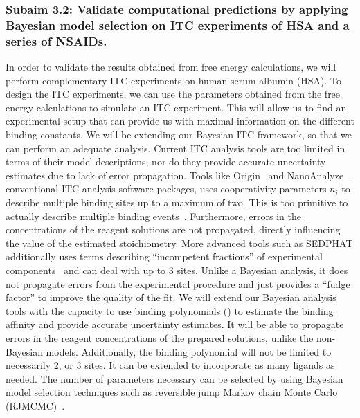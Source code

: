 \documentclass[10pt,final]{article}
\begin{document}
\subsubsection*{Subaim 3.2: Validate computational predictions by applying Bayesian model selection on ITC  experiments of HSA and a series of NSAIDs.}
In order to validate the results obtained from free energy calculations, we will perform complementary ITC experiments on human serum albumin (HSA). 
%
To design the ITC experiments, we can use the parameters obtained from the free energy calculations to simulate an ITC experiment.
%
This will allow us to find an experimental setup that can provide us with maximal information on the different binding constants.
%
We will be extending our Bayesian ITC framework, so that we can perform an adequate analysis. 
%
Current ITC analysis tools are too limited in terms of their model descriptions, nor do they provide accurate uncertainty estimates due to lack of error propagation.
%
Tools like Origin~\autocite{MicroCal2004a} and NanoAnalyze~\autocite{NanoAnalyze2014a}, conventional ITC analysis software packages, uses cooperativity parameters $n_i$ to describe multiple binding sites up to a maximum of two.
%
This is too primitive to actually describe multiple binding events~\autocite{Klotz1997a}.
%
Furthermore, errors in the concentrations of the reagent solutions are not propagated, directly influencing the value of the estimated stoichiometry.
%
More advanced tools such as SEDPHAT additionally uses terms describing ``incompetent fractions'' of experimental components~\autocite{Houtman2007a,Zhao2015b} and can deal with up to 3 sites.
%
Unlike a Bayesian analysis, it does not propagate errors from the experimental procedure and just provides a ``fudge factor'' to improve the quality of the fit.
%
We will extend our Bayesian analysis tools with the capacity to use binding polynomials () to estimate the binding affinity and provide accurate uncertainty estimates.
%
It will be able to propagate errors in the reagent concentrations of the prepared solutions, unlike the non-Bayesian models.
%
Additionally, the binding polynomial will not be limited to necessarily 2, or 3 sites. 
%
It can be extended to incorporate as many ligands as needed.
%
The number of parameters necessary can be selected by using Bayesian model selection techniques such as reversible jump Markov chain Monte Carlo (RJMCMC)~\autocite{Green1995a}.
\end{document}
